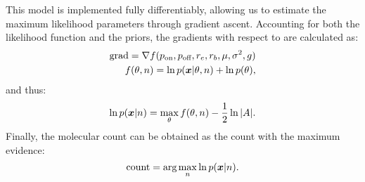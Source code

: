   This model is implemented fully differentiably, allowing us to estimate 
  the maximum likelihood parameters through gradient ascent. Accounting for 
  both the likelihood function and the priors, the gradients with respect to 
  \parameters are calculated as:
  \begin{align}
    \text{grad} = \nabla f(p_\text{on}, p_\text{off}, r_e, r_b, \mu, \sigma^2, g) \\
    f(\theta, n) = \ln p(\bm{x} | \theta, n) + \ln p(\theta) \notag
    \text{,}
  \end{align}
  and thus: 
  \begin{equation}
    \ln p(\bm{x} | n) = \max_\theta
    f(\theta, n) - \frac{1}{2} \ln |A|
    \text{.}
  \end{equation}
  Finally, the molecular count can be obtained as the count with the maximum evidence:
  \begin{equation}
      \text{count} =
      \text{arg}\max_{n}
        \ln p(\bm{x} | n)
    \text{.}
    \label{eq:method:optimization}
  \end{equation}
